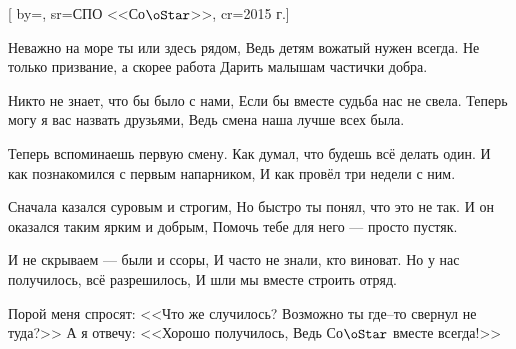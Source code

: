 [
  by={},
  sr={СПО <<Со$\oStar$>>},
  cr={2015 г.}]



\pchk


\psk



\beginverse
Неважно на море ты или здесь рядом,
Ведь детям вожатый нужен всегда.
Не только призвание, а скорее работа
Дарить малышам частички добра.
\endverse


\beginchorus
Никто не знает, что бы было с нами,
Если бы вместе судьба нас не свела.
Теперь могу я вас назвать друзьями,
Ведь смена наша лучше всех была.
\endchorus


\beginverse
Теперь вспоминаешь первую смену.
Как думал, что будешь всё делать один.
И как познакомился с первым напарником, 
И как провёл три недели с ним.

Сначала казался суровым и строгим,
Но быстро ты понял, что это не так.
И он оказался таким ярким и добрым,
Помочь тебе для него --- просто пустяк.
\endverse


\beginverse
И не скрываем --- были и ссоры,
И часто не знали, кто виноват.
Но у нас получилось, всё разрешилось,
И шли мы вместе строить отряд.
\endverse


\beginverse
Порой меня спросят: <<Что же случилось?
Возможно ты где--то свернул не туда?>>
А я отвечу: <<Хорошо получилось,
Ведь Со$\oStar$ вместе всегда!>>
\endverse

\endsong


\beginscripture{}

\endscripture
